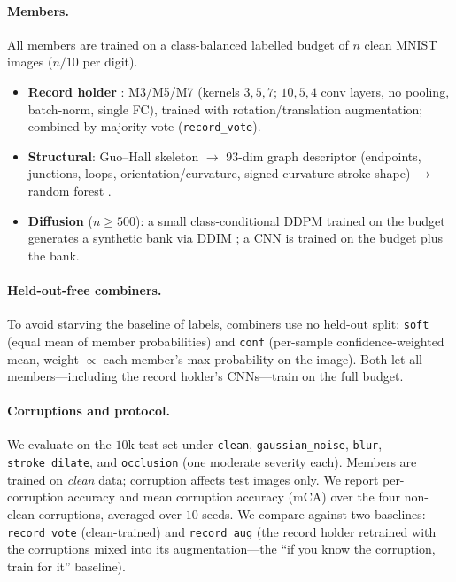 \documentclass{article}
\begin{document}
\paragraph{Members.}
All members are trained on a class-balanced labelled budget of $n$ clean MNIST images
($n/10$ per digit).
\begin{itemize}
  \item \textbf{Record holder} \cite{An2020}: M3/M5/M7 (kernels $3,5,7$; $10,5,4$ conv layers,
        no pooling, batch-norm, single FC), trained with rotation/translation augmentation;
        combined by majority vote (\texttt{record\_vote}).
  \item \textbf{Structural}: Guo--Hall skeleton \cite{GuoHall1989} $\rightarrow$ $93$-dim
        graph descriptor (endpoints, junctions, loops, orientation/curvature, signed-curvature
        stroke shape) $\rightarrow$ random forest \cite{Breiman2001}.
  \item \textbf{Diffusion} ($n\!\geq\!500$): a small class-conditional DDPM \cite{Ho2020}
        trained on the budget generates a synthetic bank via DDIM \cite{Song2021}; a CNN is
        trained on the budget plus the bank.
\end{itemize}

\paragraph{Held-out-free combiners.}
To avoid starving the baseline of labels, combiners use no held-out split: \texttt{soft}
(equal mean of member probabilities) and \texttt{conf} (per-sample confidence-weighted mean,
weight $\propto$ each member's max-probability on the image). Both let all members---including
the record holder's CNNs---train on the full budget.

\paragraph{Corruptions and protocol.}
We evaluate on the $10$k test set under \texttt{clean}, \texttt{gaussian\_noise},
\texttt{blur}, \texttt{stroke\_dilate}, and \texttt{occlusion} (one moderate severity each).
Members are trained on \emph{clean} data; corruption affects test images only. We report
per-corruption accuracy and mean corruption accuracy (mCA) over the four non-clean
corruptions, averaged over $10$ seeds. We compare against two baselines: \texttt{record\_vote}
(clean-trained) and \texttt{record\_aug} (the record holder retrained with the corruptions
mixed into its augmentation---the ``if you know the corruption, train for it'' baseline).
\end{document}
